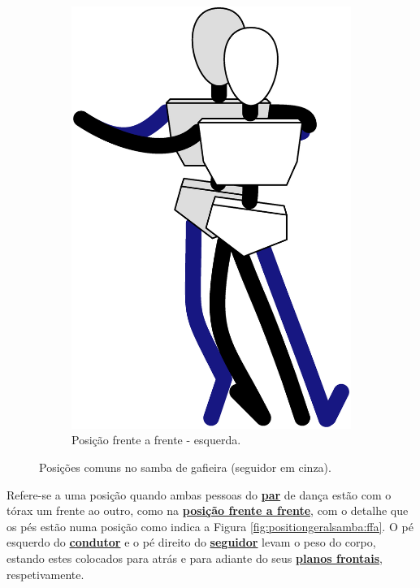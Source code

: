 \begin{figure}[!ht]
\begin{subfigure}[b]{0.285\textwidth}
         \centering
         \includegraphics[width=\textwidth]{chapters/cap-normas/position-ffe.eps}
         \caption{Posição frente a frente - esquerda.}
         \label{fig:positiongeralsamba:ffe}
     \end{subfigure}
\caption{Posições comuns no samba de gafieira (seguidor em cinza).}
\label{fig:positiongeralsamba:2}
\end{figure}



\begin{definition}
\label{def:ffa-position}  
Refere-se a uma posição quando ambas pessoas do \hyperref[def:Par]{\textbf{par}} 
de dança estão com o tórax um frente ao outro, 
como na \hyperref[def:frente-frente-position]{\textbf{posição frente a frente}},
com o detalhe que os pés estão numa posição como indica a Figura \ref{fig:positiongeralsamba:ffa}.
O pé esquerdo do \hyperref[def:Condutor]{\textbf{condutor}} e 
o pé direito do \hyperref[def:Seguidor]{\textbf{seguidor}} levam o peso do corpo,
estando estes colocados para atrás e para adiante do seus \hyperref[def:PlanoFrontal]{\textbf{planos frontais}}, 
respetivamente.
\end{definition}

